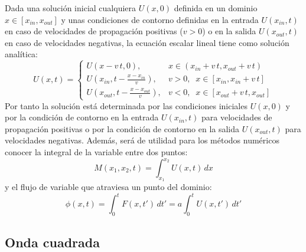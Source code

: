 \documentclass[a4paper,10pt]{report}
\newcommand{\EQ}[2]{\begin{equation}#1\label{#2}\end{equation}}
\newcommand{\C}[1]{\left[#1\right]}
\newcommand{\PA}[1]{\left(#1\right)}
\begin{document}
Dada una solución inicial cualquiera $U(x,0)$ definida en un dominio $x\in\C{x_{in},x_{out}}$ y unas condiciones de contorno definidas en la entrada $U\PA{x_{in},t}$ en caso de velocidades de propagación positivas ($v>0$) o en la salida $U(x_{out},t)$ en caso de velocidades negativas, la ecuación escalar lineal tiene como solución analítica:
\EQ
{
	U(x,t)=\left\{\begin{array}{lc}U(x-v\,t,0),&x\in(x_{in}+v\,t,x_{out}+v\,t)\\
	U\PA{x_{in},t-\frac{x-x_{in}}{v}},&v>0,\;\; x\in\C{x_{in},x_{in}+v\,t}\\
	U\PA{x_{out},t-\frac{x-x_{out}}{v}},&v<0,\;\; x\in\C{x_{out}+v\,t,x_{out}}\end{array}\right.
}{EqILinealSolucion}
Por tanto la solución está determinada por las condiciones iniciales $U(x,0)$ y por la condición de contorno en la entrada $U\PA{x_{in},t}$ para velocidades de propagación positivas o por la condición de contorno en la salida $U\PA{x_{out},t}$ para velocidades negativas. Además, será de utilidad para los métodos numéricos conocer la integral de la variable entre dos puntos:
\EQ{M\PA{x_1,x_2,t}=\int_{x_1}^{x_2}U(x,t)\,dx}{EqIMasa}
y el flujo de variable que atraviesa un punto del dominio:
\EQ{\phi(x,t)=\int_0^tF(x,t')\,dt'=a\int_0^tU(x,t')\,dt'}{EqIFlujo}

\subsection{Onda cuadrada}
\end{document}
